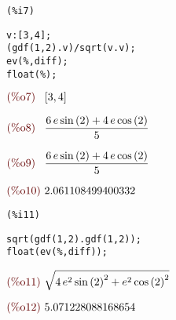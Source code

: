 \documentclass{article}
\begin{document}
\noindent
\begin{minipage}[t]{8ex}{\color{red}\bf
\begin{verbatim}
(%i7) 
\end{verbatim}}
\end{minipage}
\begin{minipage}[t]{\textwidth}{\color{blue}
\begin{verbatim}
v:[3,4];
(gdf(1,2).v)/sqrt(v.v);
ev(%,diff);
float(%);
\end{verbatim}}
\end{minipage}
\begin{math}\displaystyle
\parbox{8ex}{\color{labelcolor}(\%o7) }
[3,4]
\end{math}

\begin{math}\displaystyle
\parbox{8ex}{\color{labelcolor}(\%o8) }
\frac{6\,e\,\mathrm{sin}\left( 2\right) +4\,e\,\mathrm{cos}\left( 2\right) }{5}
\end{math}

\begin{math}\displaystyle
\parbox{8ex}{\color{labelcolor}(\%o9) }
\frac{6\,e\,\mathrm{sin}\left( 2\right) +4\,e\,\mathrm{cos}\left( 2\right) }{5}
\end{math}

\begin{math}\displaystyle
\parbox{8ex}{\color{labelcolor}(\%o10) }
2.061108499400332
\end{math}


\noindent
\begin{minipage}[t]{8ex}{\color{red}\bf
\begin{verbatim}
(%i11) 
\end{verbatim}}
\end{minipage}
\begin{minipage}[t]{\textwidth}{\color{blue}
\begin{verbatim}
sqrt(gdf(1,2).gdf(1,2));
float(ev(%,diff));
\end{verbatim}}
\end{minipage}
\begin{math}\displaystyle
\parbox{8ex}{\color{labelcolor}(\%o11) }
\sqrt{4\,{e}^{2}\,{\mathrm{sin}\left( 2\right) }^{2}+{e}^{2}\,{\mathrm{cos}\left( 2\right) }^{2}}
\end{math}

\begin{math}\displaystyle
\parbox{8ex}{\color{labelcolor}(\%o12) }
5.071228088168654
\end{math}
\end{document}
